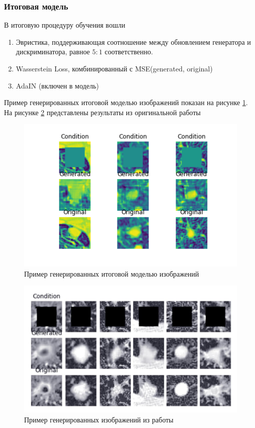 \subsubsection{Итоговая модель}
\label{section:final-gan}
В итоговую процедуру обучения вошли

\begin{enumerate}
    \item Эвристика, поддерживающая соотношение между обновлением генератора и дискриминатора, равное $5:1$ соответственно.
    \item Wasserstein Loss, комбинированный с MSE(generated, original)
    \item AdaIN (включен в модель)
\end{enumerate}

Пример генерированных итоговой моделью изображений показан на рисунке \ref{cgan-final}. На рисунке \ref{mirsky-results} представлены результаты из оригинальной работы \cite{mirsky}

\begin{figure}[!h]
\includegraphics[width=\linewidth]{images/gan-results/final-gan.png}
\caption{Пример генерированных итоговой моделью изображений}\label{cgan-final}
\centering
\end{figure}

\begin{figure}[!h]
\includegraphics[width=\linewidth]{images/mirskiy-results.jpg}
\caption{Пример генерированных изображений из работы \cite{mirsky}}\label{mirsky-results}
\centering
\end{figure}

